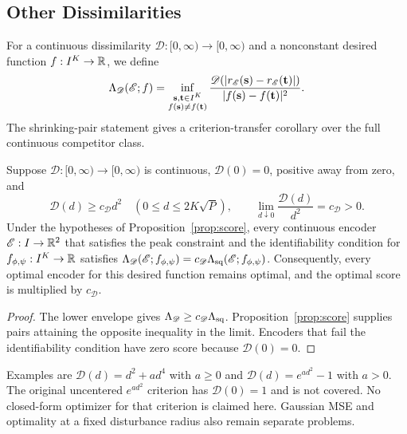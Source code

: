 \subsection{Other Dissimilarities}
For a continuous dissimilarity $\mathscr D:[0,\infty)\to[0,\infty)$ and a nonconstant desired function $f:I^K\to\mathbb R$, we define
$$
 \Lambda_{\mathscr D}(\mathscr E;f)
 =\inf_{\substack{\mathbf s,\mathbf t\in I^K\\f(\mathbf s)\ne f(\mathbf t)}}
 \frac{\mathscr D\!\left(|r_\mathscr E(\mathbf s)-r_\mathscr E(\mathbf t)|\right)}
 {|f(\mathbf s)-f(\mathbf t)|^2}.
$$
The shrinking-pair statement gives a criterion-transfer corollary over the full continuous competitor class.

\begin{corollary}
Suppose $\mathscr D:[0,\infty)\to[0,\infty)$ is continuous, $\mathscr D(0)=0$, positive away from zero, and
$$
 \mathscr D(d)\ge c_{\mathscr D}d^2\quad(0\le d\le2K\sqrt P),\qquad
 \lim_{d\downarrow0}\frac{\mathscr D(d)}{d^2}=c_{\mathscr D}>0.
$$
Under the hypotheses of Proposition~\ref{prop:score}, every continuous encoder $\mathscr E:I\to\mathbb R^2$ that satisfies the peak constraint and the identifiability condition for $f_{\phi,\psi}:I^K\to\mathbb R$ satisfies $\Lambda_{\mathscr D}(\mathscr E;f_{\phi,\psi})=c_{\mathscr D}\Lambda_{\mathrm{sq}}(\mathscr E;f_{\phi,\psi})$. Consequently, every optimal encoder for this desired function remains optimal, and the optimal score is multiplied by $c_{\mathscr D}$.
\end{corollary}
\begin{proof}
The lower envelope gives $\Lambda_{\mathscr D}\ge c_{\mathscr D}\Lambda_{\mathrm{sq}}$. Proposition~\ref{prop:score} supplies pairs attaining the opposite inequality in the limit. Encoders that fail the identifiability condition have zero score because $\mathscr D(0)=0$.
\end{proof}

Examples are $\mathscr D(d)=d^2+ad^4$ with $a\ge0$ and $\mathscr D(d)=e^{ad^2}-1$ with $a>0$. The original uncentered $e^{ad^2}$ criterion has $\mathscr D(0)=1$ and is not covered. No closed-form optimizer for that criterion is claimed here. Gaussian MSE and optimality at a fixed disturbance radius also remain separate problems.
